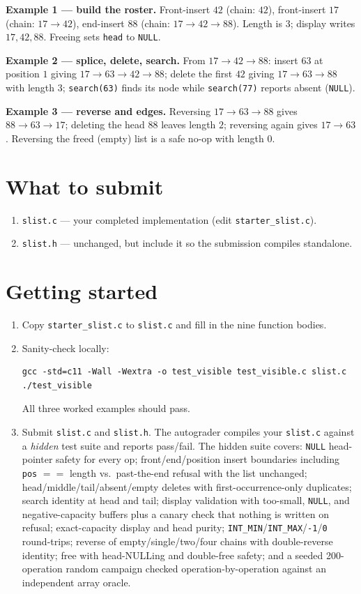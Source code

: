 \documentclass[11pt]{article}
\begin{document}
\textbf{Example 1 --- build the roster.} Front-insert $42$ (chain: $42$), front-insert $17$ (chain: $17 \to 42$), end-insert $88$ (chain: $17 \to 42 \to 88$). Length is $3$; display writes $17, 42, 88$. Freeing sets \texttt{head} to \texttt{NULL}.

\textbf{Example 2 --- splice, delete, search.} From $17 \to 42 \to 88$: insert $63$ at position $1$ giving $17 \to 63 \to 42 \to 88$; delete the first $42$ giving $17 \to 63 \to 88$ with length $3$; \texttt{search(63)} finds its node while \texttt{search(77)} reports absent (\texttt{NULL}).

\textbf{Example 3 --- reverse and edges.} Reversing $17 \to 63 \to 88$ gives $88 \to 63 \to 17$; deleting the head $88$ leaves length $2$; reversing again gives $17 \to 63$. Reversing the freed (empty) list is a safe no-op with length $0$.

\section{What to submit}

\begin{enumerate}
  \item \texttt{slist.c} --- your completed implementation (edit \texttt{starter\_slist.c}).
  \item \texttt{slist.h} --- unchanged, but include it so the submission compiles standalone.
\end{enumerate}

\section{Getting started}

\begin{enumerate}
  \item Copy \texttt{starter\_slist.c} to \texttt{slist.c} and fill in the nine function bodies.
  \item Sanity-check locally:
\begin{verbatim}
gcc -std=c11 -Wall -Wextra -o test_visible test_visible.c slist.c
./test_visible
\end{verbatim}
    All three worked examples should pass.
  \item Submit \texttt{slist.c} and \texttt{slist.h}. The autograder compiles your \texttt{slist.c} against a \emph{hidden} test suite and reports pass/fail. The hidden suite covers: \texttt{NULL} head-pointer safety for every op; front/end/position insert boundaries including \texttt{pos} $==$ length vs.\ past-the-end refusal with the list unchanged; head/middle/tail/absent/empty deletes with first-occurrence-only duplicates; search identity at head and tail; display validation with too-small, \texttt{NULL}, and negative-capacity buffers plus a canary check that nothing is written on refusal; exact-capacity display and head purity; \texttt{INT\_MIN}/\texttt{INT\_MAX}/\texttt{-1}/\texttt{0} round-trips; reverse of empty/single/two/four chains with double-reverse identity; free with head-NULLing and double-free safety; and a seeded 200-operation random campaign checked operation-by-operation against an independent array oracle.
\end{enumerate}
\end{document}
